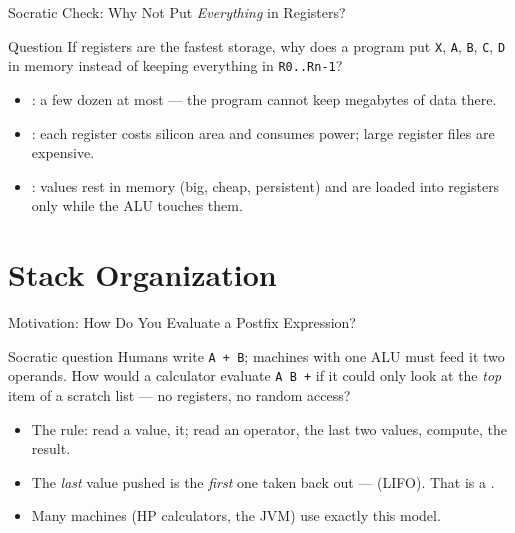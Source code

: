 \documentclass[aspectratio=169]{beamer}
\begin{document}
\begin{frame}{Socratic Check: Why Not Put \emph{Everything} in Registers?}
  \begin{alertblock}{Question}
    If registers are the fastest storage, why does a program put \texttt{X},
    \texttt{A}, \texttt{B}, \texttt{C}, \texttt{D} in memory instead of keeping
    everything in \texttt{R0..Rn-1}?
  \end{alertblock}
  \begin{itemize}
    \item {}: a few dozen at most --- the program cannot
      keep megabytes of data there.
    \item {}: each register costs silicon area and consumes power; large
      register files are expensive.
    \item {}: values rest in memory (big, cheap, persistent) and are loaded
      into registers only while the ALU touches them.
  \end{itemize}
\end{frame}

\section{Stack Organization}


\begin{frame}{Motivation: How Do You Evaluate a Postfix Expression?}
  \begin{block}{Socratic question}
    Humans write \texttt{A + B}; machines with one ALU must feed it two operands.
    How would a calculator evaluate \texttt{A B +} if it could only look at the
    \emph{top} item of a scratch list --- no registers, no random access?
  \end{block}
  \begin{itemize}
    \item The rule: read a value,  it; read an operator, 
      the last two values, compute,  the result.
    \item The \emph{last} value pushed is the \emph{first} one taken back out ---
       (LIFO). That is a .
    \item Many machines (HP calculators, the JVM) use exactly this model.
  \end{itemize}
\end{frame}
\end{document}
